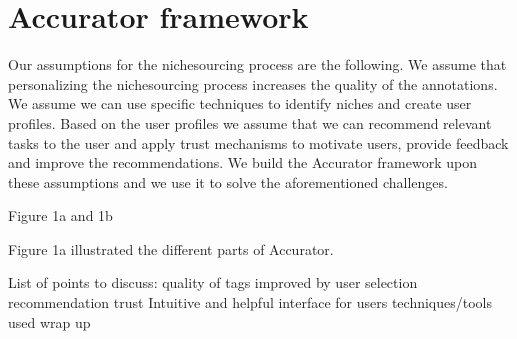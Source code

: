 \section{Accurator framework}
\label{architecture}
Our assumptions for the nichesourcing process are the following. 
We assume that personalizing the nichesourcing process increases the quality of the annotations. 
We assume we can use specific techniques to identify niches and create user profiles. 
Based on the user profiles we assume that we can recommend relevant tasks to the user and apply trust mechanisms to motivate users, provide feedback and improve the recommendations.  
We build the Accurator framework upon these assumptions and we use it to solve the aforementioned challenges. 

Figure 1a and 1b

Figure 1a illustrated the different parts of Accurator. 

List of points to discuss:
quality of tags improved by
user selection
recommendation
trust
Intuitive and helpful interface for users 
techniques/tools used
wrap up

